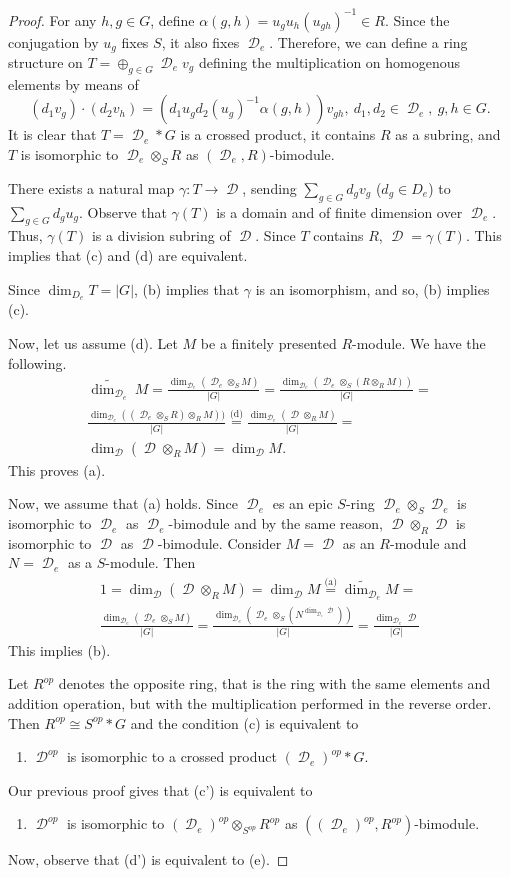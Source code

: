 \documentclass[11pt]{amsart}
\numberwithin{claimcounter}{lem}
\newcommand{\myeq}[1]{\ensuremath{\stackrel{\text{#1}}{=}}}
\DeclareMathOperator{\D}{\mathcal D}
\begin{document}
\begin{proof} For any $h,g\in G$, define $\alpha(g,h)=u_gu_h(u_{gh})^{-1}\in R$. Since the conjugation by $u_g$ fixes $S$, it also fixes $\D_e$. Therefore, we can define a ring structure on $T=\oplus_{g\in G}\D_ev_g$ defining the multiplication on homogenous elements by means of
$$ (d_1v_g)\cdot (d_2v_h)=(d_1u_gd_2(u_g)^{-1}\alpha(g,h))v_{gh}, \ d_1,d_2\in \D_e, \ g,h\in G.$$
It is clear that $T=\D_e*G$ is a crossed product, it contains  $R$ as a subring, and $T$ is isomorphic to $\D_e\otimes_ S R$ as $(\D_e , R)$-bimodule.

There exists a natural map $\gamma: T\to \D$, sending $\sum_{g\in G} d_gv_g$ ($d_g\in D_e$) to $\sum_{g\in G} d_gu_g$. Observe that $\gamma(T)$ is a domain and of finite dimension over $\D_e$. Thus, $\gamma(T)$ is a division subring of $\D$. Since $T$ contains $R$, $\D=\gamma(T)$.  This implies that (c) and (d) are equivalent. 

Since $\dim_{D_e} T=|G|$,  (b) implies that $\gamma$ is an isomorphism, and so, (b) implies (c).

Now, let us assume (d). Let $M$ be a finitely presented  $R$-module. We have the following.
\begin{multline*}
\widetilde{\dim_{\D_e}}\ M= \frac{  \dim_{\D_e}(\D_e\otimes _S M)}{|G|}=
\frac{\dim_{\D_e}(\D_e\otimes_S(R\otimes _R M))}{|G|}=\\
\frac{\dim_{\D_e}((\D_e\otimes_SR)\otimes _R M))}{|G|}\myeq{(d)}
\frac{\dim_{\D_e}(\D\otimes_R M)}{|G|}=\\ \dim_{\D} (\D\otimes_R M)=\dim_{\D} M.\end{multline*}
This proves (a).

Now, we assume that (a) holds. Since $\D_e$ es an epic $S$-ring $\D_e\otimes_S \D_e$ is isomorphic to $\D_e$ as $\D_e$-bimodule and by the same reason, $\D \otimes_R \D $ is isomorphic to $\D $ as $\D $-bimodule. Consider $M=\D$ as an $R$-module and $N=\D_e$ as a $S$-module. Then 
\begin{multline*}1=\dim_{\D}(\D\otimes_R M)=\dim_{\D} M\myeq{(a)}\widetilde{\dim_{\D_e}} M=\\
\frac{\dim_{\D_e}(\D_e\otimes_S M)}{|G|}=\frac{\dim_{\D_e}(\D_e\otimes_S(N^{\dim_{\D_e} \D}))}{|G|}=\frac{\dim_{\D_e} \D}{|G|}
\end{multline*}
This implies (b).


Let $R^{op}$ denotes the opposite ring, that is the ring with the same elements and addition operation, but with the multiplication performed in the reverse order. Then $R^{op}\cong S^{op}*G$ and the condition (c) is equivalent to
\begin{enumerate}
 \item[(c')] $\D^{op}$ is isomorphic to a crossed product $(\D_e)^{op}*G$.
 \end{enumerate}
Our previous proof gives that (c') is equivalent to  
\begin{enumerate}
 \item[(d')] $\D^{op}$ is isomorphic to $(\D_e)^{op}\otimes_ {S^{op}}R^{op}$ as $((\D_e)^{op} , R^{op})$-bimodule.
  \end{enumerate}
Now, observe  that (d') is equivalent to (e).
\end{proof}
\end{document}
